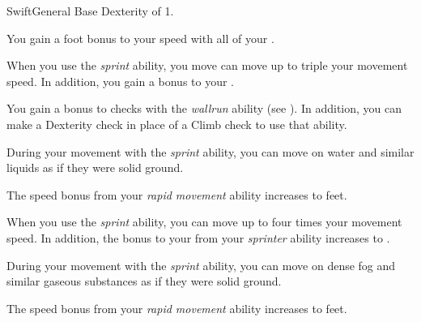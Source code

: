     \begin{feat}{Swift}{General}
        \featpre Base Dexterity of 1.

         You gain a  foot bonus to your speed with all of your .

         When you use the \textit{sprint} ability, you move can move up to triple your movement speed.
        In addition, you gain a  bonus to your .

         You gain a  bonus to checks with the \textit{wallrun} ability (see ).
        In addition, you can make a Dexterity check in place of a Climb check to use that ability.

         During your movement with the \textit{sprint} ability, you can move on water and similar liquids as if they were solid ground.

         The speed bonus from your \textit{rapid movement} ability increases to  feet.

         When you use the \textit{sprint} ability, you can move up to four times your movement speed.
        In addition, the bonus to your  from your \textit{sprinter} ability increases to .

         During your movement with the \textit{sprint} ability, you can move on dense fog and similar gaseous substances as if they were solid ground.

         The speed bonus from your \textit{rapid movement} ability increases to  feet.
    \end{feat}

